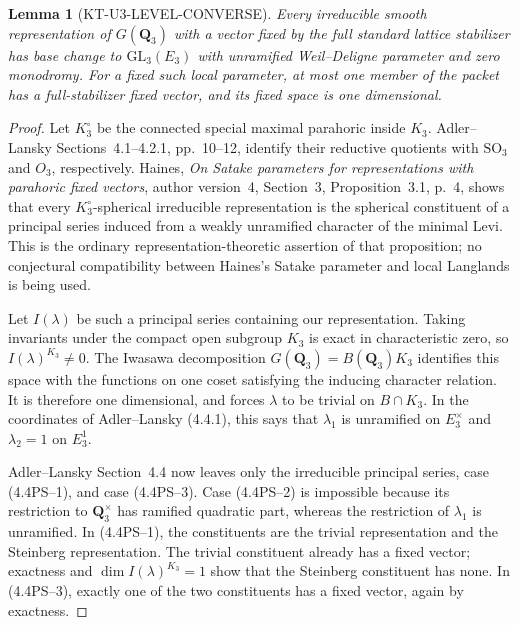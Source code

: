 \documentclass[11pt,a4paper]{article}
\newtheorem{lemma}[theorem]{Lemma}
\theoremstyle{definition}
\begin{document}
\begin{lemma}[KT-U3-LEVEL-CONVERSE]
Every irreducible smooth representation of $G(\mathbf Q_3)$ with a
vector fixed by the full standard lattice stabilizer has base change to
$\mathrm{GL}_3(E_3)$ with unramified Weil--Deligne parameter and zero
monodromy. For a fixed such local parameter, at most one member of the
packet has a full-stabilizer fixed vector, and its fixed space is one
dimensional.
\end{lemma}
\begin{proof}
Let $K_3^\circ$ be the connected special maximal parahoric inside $K_3$.
Adler--Lansky Sections~4.1--4.2.1, pp.~10--12, identify their reductive
quotients with $\mathrm{SO}_3$ and $O_3$, respectively.
Haines, \emph{On Satake parameters for representations with parahoric
fixed vectors}, author version~4, Section~3, Proposition~3.1, p.~4,
shows that every $K_3^\circ$-spherical irreducible representation is the
spherical constituent of a principal series induced from a weakly
unramified character of the minimal Levi. This is the ordinary
representation-theoretic assertion of that proposition; no conjectural
compatibility between Haines's Satake parameter and local Langlands is
being used.

Let $I(\lambda)$ be such a principal series containing our representation.
Taking invariants under the compact open subgroup $K_3$ is exact in
characteristic zero, so $I(\lambda)^{K_3}\ne0$. The Iwasawa decomposition
$G(\mathbf Q_3)=B(\mathbf Q_3)K_3$ identifies this space with the
functions on one coset satisfying the inducing character relation.
It is therefore one dimensional, and forces $\lambda$ to be trivial on
$B\cap K_3$. In the coordinates of Adler--Lansky (4.4.1), this says
that $\lambda_1$ is unramified on $E_3^\times$ and $\lambda_2=1$ on
$E_3^1$.

Adler--Lansky Section~4.4 now leaves only the irreducible principal
series, case (4.4PS--1), and case (4.4PS--3). Case (4.4PS--2) is
impossible because its restriction to $\mathbf Q_3^\times$ has ramified
quadratic part, whereas the restriction of $\lambda_1$ is unramified.
In (4.4PS--1), the constituents are the trivial representation and the
Steinberg representation. The trivial constituent already has a fixed
vector; exactness and $\dim I(\lambda)^{K_3}=1$ show that the Steinberg
constituent has none. In (4.4PS--3), exactly one of the two constituents
has a fixed vector, again by exactness.


\end{proof}
\end{document}

